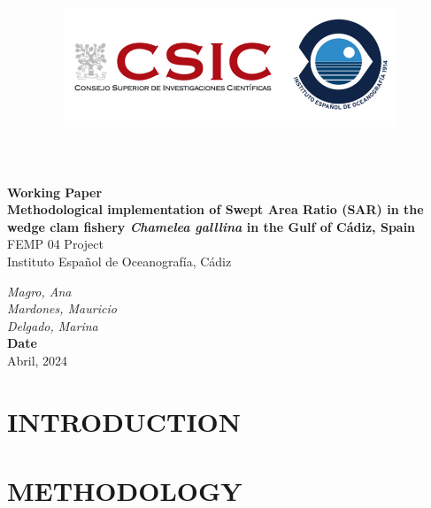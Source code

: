 \documentclass[
]{article}
\title{\includegraphics[width=10cm,height=\textheight]{IEO-logo2.png}}
\author{}
\date{\vspace{-2.5em}}
\begin{document}
\maketitle



\begin{flushleft}
\Large{\textbf{Working Paper}}\\
\vspace*{2\baselineskip}
\LARGE{\textbf{Methodological implementation of Swept Area Ratio (SAR) in the wedge clam fishery \textit{Chamelea galllina} in the Gulf of Cádiz, Spain}}\\
\vspace*{5\baselineskip}
\Large{FEMP 04 Project}\\
\vspace*{1\baselineskip}
\Large{Instituto Español de Oceanografía, Cádiz }\\
\vspace*{4\baselineskip}
\end{flushleft}
\begin{flushright}
\large{\textit{Magro, Ana}}\\
\large{\textit{Mardones, Mauricio}}\\
\large{\textit{Delgado, Marina}}\\
\vspace*{1\baselineskip}
\normalsize{\textbf{Date}}\\
Abril, 2024
\end{flushright}



\hypersetup{linkcolor = black}
\newpage
{}

\newpage



\hypersetup{linkcolor = blue}

{
\hypersetup{linkcolor=}
\setcounter{tocdepth}{3}
\tableofcontents
}
\newpage

\hypertarget{introduction}{%
\section{INTRODUCTION}\label{introduction}}

\hypertarget{methodology}{%
\section{METHODOLOGY}\label{methodology}}
\end{document}
